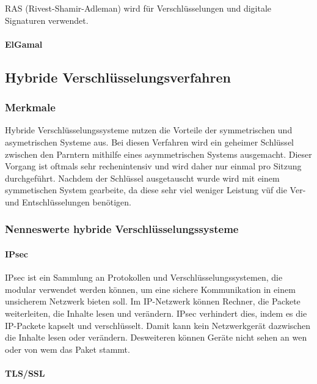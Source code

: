 \documentclass[11pt,a4paper]{report}
\begin{document}
RAS (Rivest-Shamir-Adleman) wird für Verschlüsselungen und digitale Signaturen verwendet.

\paragraph{ElGamal}



\subsection{Hybride Verschlüsselungsverfahren}

\subsubsection{Merkmale}

Hybride Verschlüsselungssysteme nutzen die Vorteile der symmetrischen und asymetrischen Systeme aus. Bei diesen Verfahren wird ein geheimer Schlüssel zwischen den Parntern mithilfe eines asymmetrischen Systems ausgemacht. Dieser Vorgang ist oftmals sehr rechenintensiv und wird daher nur einmal pro Sitzung durchgeführt. Nachdem der Schlüssel ausgetauscht wurde wird mit einem symmetischen System gearbeite, da diese sehr viel weniger Leistung vüf die Ver- und Entschlüsselungen benötigen.

\subsubsection{Nenneswerte hybride Verschlüsselungssysteme}

\paragraph{IPsec}

IPsec ist ein Sammlung an Protokollen und Verschlüsselungssystemen, die modular verwendet werden können, um eine sichere Kommunikation in einem unsicherem Netzwerk bieten soll. Im IP-Netzwerk können Rechner, die Packete weiterleiten, die Inhalte lesen und verändern. IPsec verhindert dies, indem es die IP-Packete kapselt und verschlüsselt. Damit kann kein Netzwerkgerät dazwischen die Inhalte lesen oder verändern. Desweiteren können Geräte nicht sehen an wen oder von wem das Paket stammt.

\paragraph{TLS/SSL}
\end{document}
